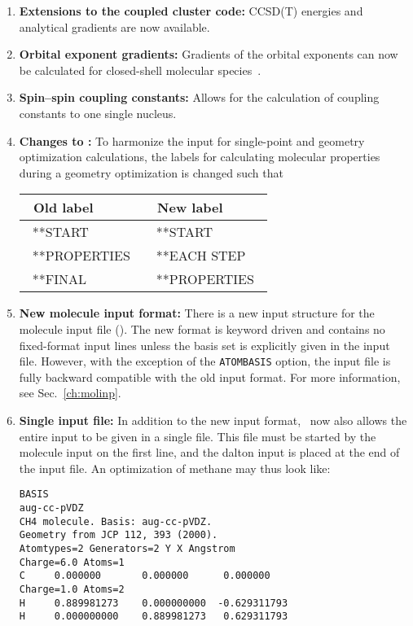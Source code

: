 \begin{enumerate}
\item{\bf Extensions to the coupled cluster code:} CCSD(T) energies
  and analytical gradients are now available.

\item{\bf Orbital exponent gradients:} Gradients of the orbital
exponents can now be calculated for closed-shell molecular
species~\cite{fjthjcp121}.

\item{\bf Spin--spin coupling constants:} Allows for the calculation
  of coupling constants to one single nucleus.

\item{\bf Changes to \dalinp:} To harmonize the input for
  single-point and geometry optimization calculations, the labels for
  calculating  molecular properties during a geometry optimization is
  changed such that

\begin{center}
\begin{tabular}{|l|l|}\hline
\ Old label     & \ New label     \\\hline
\ **START       & \ **START       \\
\ **PROPERTIES\ & \ **EACH STEP   \\
\ **FINAL       & \ **PROPERTIES\ \\\hline
\end{tabular}
\end{center}

\item{\bf New molecule input format:} There is a new input structure
  for the molecule input file (\molinp). The new format is keyword driven and
  contains no fixed-format input lines unless the basis set is
  explicitly given in the input file. However, with the exception of
  the \verb|ATOMBASIS| option, the input file is fully backward
  compatible with the old input format. For more information, see
  Sec.~\ref{ch:molinp}.

\item{\bf Single input file:} In addition to the new input format,
  \dalton\ now also allows the entire input to be given in a
  single file. This file must be started by the molecule input on the
  first line, and the dalton input is placed at the end of the input
  file. An optimization of methane may thus look like:

\begin{verbatim}
BASIS
aug-cc-pVDZ
CH4 molecule. Basis: aug-cc-pVDZ.
Geometry from JCP 112, 393 (2000).
Atomtypes=2 Generators=2 Y X Angstrom
Charge=6.0 Atoms=1
C     0.000000       0.000000      0.000000
Charge=1.0 Atoms=2
H     0.889981273    0.000000000  -0.629311793
H     0.000000000    0.889981273   0.629311793


\end{verbatim}
\end{enumerate}
